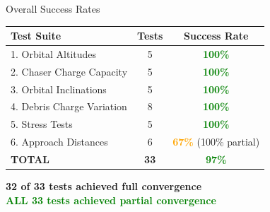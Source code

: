 \documentclass[aspectratio=169]{beamer}
\begin{document}
\begin{frame}{Overall Success Rates}
\begin{table}
\begin{tabular}{lcc}
\toprule
\textbf{Test Suite} & \textbf{Tests} & \textbf{Success Rate} \\
\midrule
1. Orbital Altitudes & 5 & \textcolor{green}{\textbf{100\%}} \\
2. Chaser Charge Capacity & 5 & \textcolor{green}{\textbf{100\%}} \\
3. Orbital Inclinations & 5 & \textcolor{green}{\textbf{100\%}} \\
4. Debris Charge Variation & 8 & \textcolor{green}{\textbf{100\%}} \\
5. Stress Tests & 5 & \textcolor{green}{\textbf{100\%}} \\
6. Approach Distances & 6 & \textcolor{orange}{\textbf{67\%}} (100\% partial) \\
\midrule
\textbf{TOTAL} & \textbf{33} & \textcolor{green}{\textbf{97\%}} \\
\bottomrule
\end{tabular}
\end{table}

\vspace{1em}
\begin{center}
\Large\textbf{32 of 33 tests achieved full convergence}\\
\Large\textcolor{green}{\textbf{ALL 33 tests achieved partial convergence}}
\end{center}
\end{frame}
\end{document}

